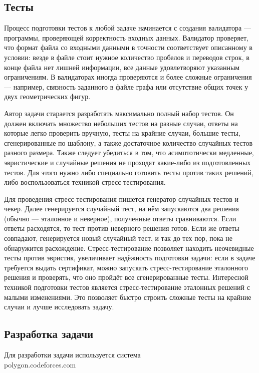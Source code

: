 \subsection{Тесты}

Процесс подготовки тестов к любой задаче начинается с создания валидатора — программы, проверяющей корректность входных данных. Валидатор проверяет, что формат файла со входными данными в точности соответствует описанному в условии: везде в файле стоит нужное количество пробелов и переводов строк, в конце файла нет лишней информации, все данные удовлетворяют указанным ограничениям. В валидаторах иногда проверяются и более сложные ограничения — например, связность заданного в файле графа или отсутствие общих точек у двух геометрических фигур.

Автор задачи старается разработать максимально полный набор тестов. Он должен включать множество небольших тестов на разные случаи, ответы на которые легко проверить вручную, тесты на крайние случаи, большие тесты, сгенерированные по шаблону, а также достаточное количество случайных тестов разного размера. Также следует убедиться в том, что асимптотически медленные, эвристические и случайные решения не проходят какие-либо из подготовленных тестов. Для этого нужно либо специально готовить тесты против таких решений, либо воспользоваться техникой стресс-тестирования.

Для проведения стресс-тестирования пишется генератор случайных тестов и чекер. Далее генерируется случайный тест, на нём запускаются два решения (обычно — эталонное и неверное), полученные ответы сравниваются. Если ответы расходятся, то тест против неверного решения готов. Если же ответы совпадают, генерируется новый случайный тест, и так до тех пор, пока не обнаружится расхождение. Стресс-тестирование позволяет находить неочевидные тесты против эвристик, увеличивает надёжность подготовки задачи: если в задаче требуется выдать сертификат, можно запускать стресс-тестирование эталонного решения и проверять, что оно пройдёт все сгенерированные тесты. Интересной техникой подготовки тестов является стресс-тестирование эталонных решений с малыми изменениями. Это позволяет быстро строить сложные тесты на крайние случаи и лучше исследовать задачу.

\subsection{Разработка задачи}
Для разработки задачи используется система \\polygon.codeforces.com

